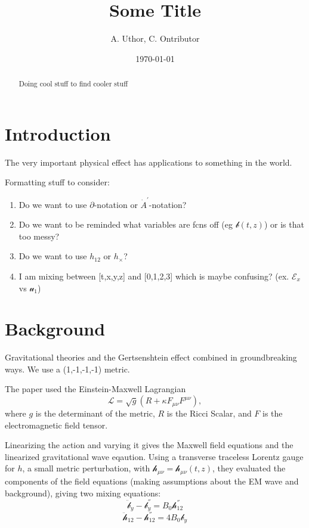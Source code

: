 \documentclass[letterpaper,12pt]{article}
\begin{document}
\title{Some Title}
\author{A. Uthor, C. Ontributor}
\date{\today}
\maketitle

\begin{abstract}
Doing cool stuff to find cooler stuff
\end{abstract}


\section{Introduction}

The very important physical effect has applications to something in the world. 

Formatting stuff to consider:
\begin{enumerate}
\item Do we want to use $\partial$-notation or $\dot{A}^{'}$-notation?
\item Do we want to be reminded what variables are fcns off (eg $\mathcal{b}(t,z)$) or is that too messy?
\item Do we want to use $h_{12}$ or $h_{\times}$? 
\item I am mixing between [t,x,y,z] and [0,1,2,3] which is maybe confusing? (ex. $\mathcal{E}_x$ vs $\mathcal{u}_1$)
\end{enumerate}


\section{Background}

Gravitational theories and the Gertsenshtein effect combined in groundbreaking ways.
We use a (1,-1,-1,-1) metric.

The paper used the Einstein-Maxwell Lagrangian
\begin{equation}
\mathcal{L}=\sqrt{g}(R+\kappa F_{\mu \nu}F^{\mu \nu}),
\end{equation}
where $g$ is the determinant of the metric, $R$ is the Ricci Scalar, and $F$ is the electromagnetic field tensor. 

Linearizing the action and varying it gives the Maxwell field equations and the linearized gravitational wave eqaution. Using a transverse traceless Lorentz gauge for $h$, a small metric perturbation, with $\mathcal{h}_{\mu \nu}=\mathcal{h}_{\mu \nu}(t,z)$, they evaluated the components of the field equations (making assumptions about the EM wave and background), giving two mixing equations:
\begin{equation}
\ddot{ \mathcal{b}}_y - \mathcal{b}_y^{''}=B_0\mathcal{h}^{''}_{12}
\end{equation}
\begin{equation}
\ddot{ \mathcal{h}}_{12} - \mathcal{h}^{''}_{12}=4B_0 \mathcal{b}_y
\end{equation}
\end{document}
